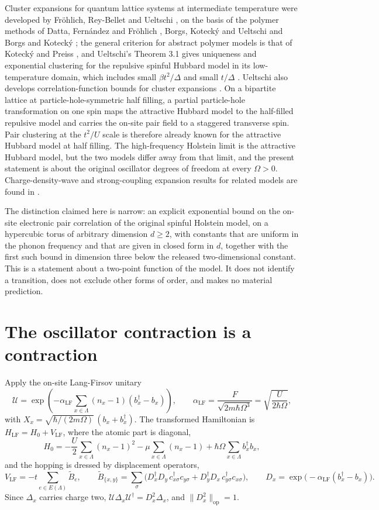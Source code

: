 \documentclass[11pt]{article}
\theoremstyle{plain}
\theoremstyle{definition}
\newcommand{\Dop}{\Delta}
\begin{document}
Cluster expansions for quantum lattice systems at intermediate temperature were
developed by Fr\"ohlich, Rey-Bellet and Ueltschi \cite{fruhlich}, on the basis of the
polymer methods of Datta, Fern\'andez and Fr\"ohlich \cite{dff}, Borgs, Koteck\'y and
Ueltschi \cite{bku} and Borgs and Koteck\'y \cite{bkfermion}; the general criterion
for abstract polymer models is that of Koteck\'y and Preiss \cite{kp}, and
Ueltschi's Theorem 3.1 gives uniqueness and exponential clustering for the repulsive
spinful Hubbard model in its low-temperature domain, which includes small
$\beta t^2/\Delta$ and small $t/\Delta$ \cite{uelschiHubbard}. Ueltschi also develops
correlation-function bounds for cluster expansions \cite{uelschiCorrelations}. On a
bipartite lattice at particle-hole-symmetric half filling, a partial particle-hole
transformation on one spin maps the attractive Hubbard model to the half-filled
repulsive model and carries the on-site pair field to a staggered transverse spin.
Pair clustering at the $t^2/U$ scale is therefore already known for the attractive
Hubbard model at half filling. The high-frequency Holstein limit is the attractive
Hubbard model, but the two models differ away from that limit, and the present
statement is about the original oscillator degrees of freedom at every
$\Omega>0$. Charge-density-wave and strong-coupling expansion results for related
models are found in \cite{macris,freericks}.

The distinction claimed here is narrow: an explicit exponential bound on the
on-site electronic pair correlation of the original spinful Holstein model, on a
hypercubic torus of arbitrary dimension $d\ge2$, with constants that are uniform in
the phonon frequency and that are given in closed form in $d$, together with the
first such bound in dimension three below the released two-dimensional constant.
This is a statement about a two-point function of the model. It does not identify a
transition, does not exclude other forms of order, and makes no material prediction.

\section{The oscillator contraction is a contraction}\label{sec:langfirsov}

Apply the on-site Lang-Firsov unitary
\[
 \mathcal U=\exp\!\left(-\alpha_{\mathrm{LF}}\sum_{x\in\Lambda}
 (n_x-1)(b_x^\dagger-b_x)\right),
 \qquad
 \alpha_{\mathrm{LF}}=\frac{F}{\sqrt{2m\hbar\Omega^3}}
 =\sqrt{\frac{U}{2\hbar\Omega}},
\]
with $X_x=\sqrt{\hbar/(2m\Omega)}\,(b_x+b_x^\dagger)$. The transformed Hamiltonian
is $H_{\mathrm{LF}}=H_0+V_{\mathrm{LF}}$, where the atomic part is diagonal,
\[
 H_0=-\frac U2\sum_{x\in\Lambda}(n_x-1)^2-\mu\sum_{x\in\Lambda}(n_x-1)
 +\hbar\Omega\sum_{x\in\Lambda}b_x^\dagger b_x,
\]
and the hopping is dressed by displacement operators,
\[
 V_{\mathrm{LF}}=-t\sum_{e\in E(\Lambda)}\widetilde B_e,\qquad
 \widetilde B_{\{x,y\}}=\sum_{\sigma}\bigl(D_x^\dagger D_y\,c_{x\sigma}^\dagger
 c_{y\sigma}+D_y^\dagger D_x\,c_{y\sigma}^\dagger c_{x\sigma}\bigr),
\qquad
 D_x=\exp\!\bigl(-\alpha_{\mathrm{LF}}(b_x^\dagger-b_x)\bigr).
\]
Since $\Dop_x$ carries charge two, $\mathcal U\Dop_x\mathcal U^\dagger
=D_x^2\Dop_x$, and $\|D_x^2\|_{\mathrm{op}}=1$.
\end{document}
